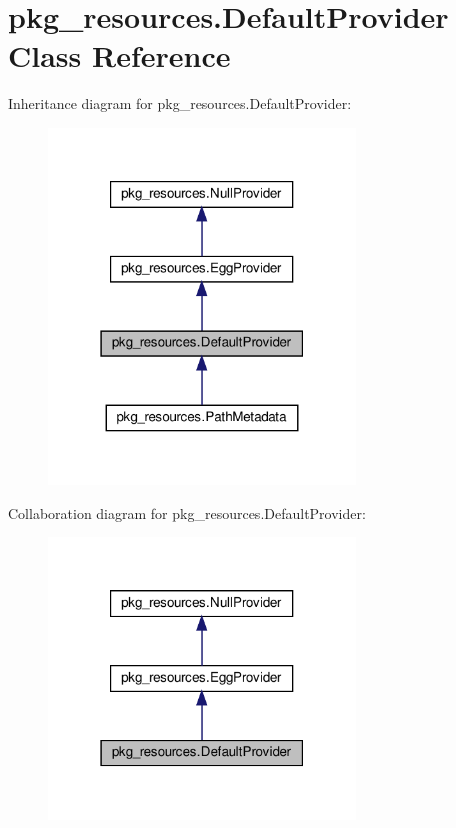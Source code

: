 \hypertarget{classpkg__resources_1_1DefaultProvider}{}\section{pkg\+\_\+resources.\+Default\+Provider Class Reference}
\label{classpkg__resources_1_1DefaultProvider}


Inheritance diagram for pkg\+\_\+resources.\+Default\+Provider\+:
\nopagebreak
\begin{figure}[H]
\begin{center}
\leavevmode
\includegraphics[width=231pt]{classpkg__resources_1_1DefaultProvider__inherit__graph}
\end{center}
\end{figure}


Collaboration diagram for pkg\+\_\+resources.\+Default\+Provider\+:
\nopagebreak
\begin{figure}[H]
\begin{center}
\leavevmode
\includegraphics[width=231pt]{classpkg__resources_1_1DefaultProvider__coll__graph}
\end{center}
\end{figure}

